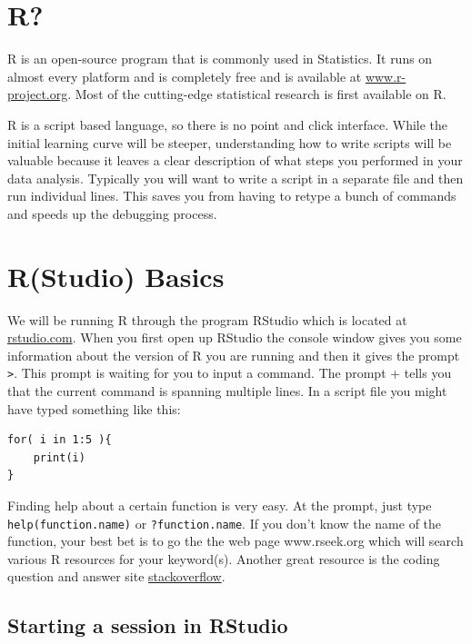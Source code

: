 \documentclass[
  letterpaper,
  DIV=11,
  numbers=noendperiod]{scrreprt}
\begin{document}
\section{R?}\label{r}

R is an open-source program that is commonly used in Statistics. It runs
on almost every platform and is completely free and is available at
\url{www.r-project.org}. Most of the cutting-edge statistical research
is first available on R.

R is a script based language, so there is no point and click interface.
While the initial learning curve will be steeper, understanding how to
write scripts will be valuable because it leaves a clear description of
what steps you performed in your data analysis. Typically you will want
to write a script in a separate file and then run individual lines. This
saves you from having to retype a bunch of commands and speeds up the
debugging process.

\section{R(Studio) Basics}\label{rstudio-basics}

We will be running R through the program RStudio which is located at
\href{http://www.rstudio.org}{rstudio.com}. When you first open up
RStudio the console window gives you some information about the version
of R you are running and then it gives the prompt
\texttt{\textgreater{}}. This prompt is waiting for you to input a
command. The prompt + tells you that the current command is spanning
multiple lines. In a script file you might have typed something like
this:

\begin{verbatim}
for( i in 1:5 ){
    print(i)
}
\end{verbatim}

Finding help about a certain function is very easy. At the prompt, just
type \texttt{help(function.name)} or \texttt{?function.name}. If you
don't know the name of the function, your best bet is to go the the web
page www.rseek.org which will search various R resources for your
keyword(s). Another great resource is the coding question and answer
site \href{http://stackoverflow.com}{stackoverflow}.

\subsection{Starting a session in
RStudio}\label{starting-a-session-in-rstudio}
\end{document}
